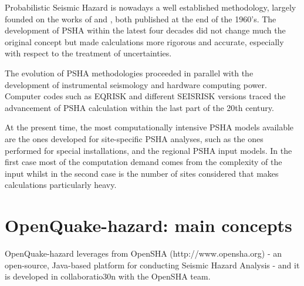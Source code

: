 Probabilistic Seismic Hazard is nowadays a well established methodology, largely 
founded on the works of \citeauthor{cornell1968} and \citeauthor{esteva1968}, 
both published at the end of the 1960's. 
%
The development of PSHA within the latest four decades did not change much the 
original concept but made calculations more rigorous and accurate, especially 
with respect to the treatment of uncertainties. 

The evolution of PSHA methodologies proceeded in parallel with the development 
of instrumental seismology and hardware computing power. Computer codes such as
EQRISK \citep{mcguire1976} and different SEISRISK versions 
\citep{bender1982,bender1987} traced the advancement of PSHA calculation within
the last part of the 20th century.

At the present time, the most computationally intensive PSHA models available 
are the ones developed for site-specific PSHA analyses, such as the ones 
performed for special installations, and the regional PSHA input models. 
In the first case most of the computation demand comes from the complexity 
of the input whilst in the second case is the number of sites considered that 
makes calculations particularly heavy.  
%
\section{OpenQuake-hazard: main concepts}
OpenQuake-hazard leverages from OpenSHA (http://www.opensha.org) - an 
open-source, Java-based platform for conducting Seismic Hazard Analysis - and 
it is developed in collaboratio30n with the OpenSHA team. 

